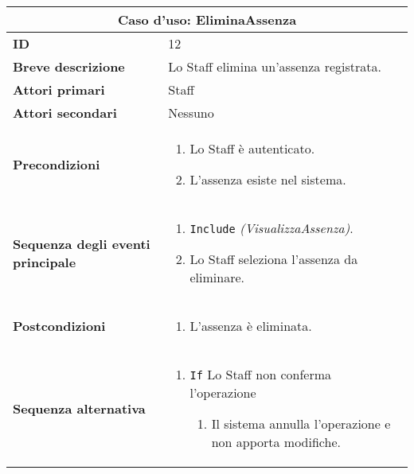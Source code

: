 \documentclass[a4paper]{report}
\begin{document}
\clearpage
\begin{table}[H]
\vspace*{-0cm}
\renewcommand{\arraystretch}{1.9}
\begin{tabular}{|p{3.9cm}|p{9.9cm}|}
\hline
\multicolumn{2}{|c|}{\textbf{Caso d’uso: EliminaAssenza}} \\ \hline
\textbf{ID} & 12 \\ \hline
\textbf{Breve descrizione} & Lo Staff elimina un’assenza registrata. \\ \hline
\textbf{Attori primari} & Staff \\ \hline
\textbf{Attori secondari} & Nessuno \\ \hline
\textbf{Precondizioni} & \begin{enumerate}[leftmargin=14pt,label=\arabic*.,labelsep=0.5em,topsep=0pt,partopsep=0pt,parsep=0pt,itemsep=0pt]
    \item Lo Staff è autenticato.
    \item L’assenza esiste nel sistema.
\end{enumerate} \\ \hline
\textbf{Sequenza degli eventi principale} & \begin{enumerate}[leftmargin=14pt,label=\arabic*.,labelsep=0.5em,topsep=0pt,partopsep=0pt,parsep=0pt,itemsep=0pt]
    \item \texttt{Include} \textit{(VisualizzaAssenza)}.
    \item Lo Staff seleziona l’assenza da eliminare.
\end{enumerate} \\ \hline
\textbf{Postcondizioni} & \begin{enumerate}[label=\arabic*.,leftmargin=14pt,labelsep=0.5em,topsep=0pt,partopsep=0pt,parsep=0pt,itemsep=0pt]
        \item L’assenza è eliminata.
\end{enumerate} \\ \hline
\textbf{Sequenza alternativa} & \begin{enumerate}[leftmargin=14pt,label=\arabic*.,labelsep=0.5em,topsep=0pt,partopsep=0pt,parsep=0pt,itemsep=0pt]
    \item \texttt{If} Lo Staff non conferma l’operazione
    \begin{enumerate}[label=\arabic{enumi}.\arabic*.,leftmargin=22pt,labelsep=0.5em,topsep=0pt,partopsep=0pt,parsep=0pt,itemsep=0pt]
        \item Il sistema annulla l’operazione e non apporta modifiche.
    \end{enumerate}
\end{enumerate} \\ \hline
\end{tabular}
\end{table}
\end{document}

